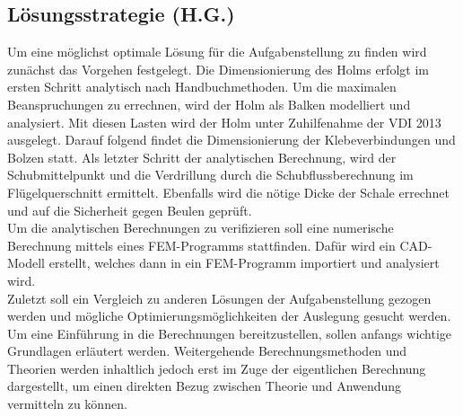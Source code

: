 \subsection{Lösungsstrategie (H.G.)}
Um eine möglichst optimale Lösung für die Aufgabenstellung zu finden wird zunächst das Vorgehen festgelegt. Die Dimensionierung des Holms erfolgt im ersten Schritt analytisch nach Handbuchmethoden. Um die maximalen Beanspruchungen zu errechnen, wird der Holm als Balken modelliert und analysiert. Mit diesen Lasten wird der Holm unter Zuhilfenahme der VDI 2013 ausgelegt. Darauf folgend findet die Dimensionierung der Klebeverbindungen und Bolzen statt. Als letzter Schritt der analytischen Berechnung, wird der Schubmittelpunkt und die Verdrillung durch die Schubflussberechnung im Flügelquerschnitt ermittelt. Ebenfalls wird die nötige Dicke der Schale errechnet und auf die Sicherheit gegen Beulen geprüft. \\
Um die analytischen Berechnungen zu verifizieren soll eine numerische Berechnung mittels eines FEM-Programms stattfinden. Dafür wird ein CAD-Modell erstellt, welches dann in ein FEM-Programm importiert und analysiert wird.\\
Zuletzt soll ein Vergleich zu anderen Lösungen der Aufgabenstellung gezogen werden und mögliche Optimierungsmöglichkeiten der Auslegung gesucht werden.\\

\noindent Um eine Einführung in die Berechnungen bereitzustellen, sollen anfangs wichtige Grundlagen erläutert werden. Weitergehende Berechnungsmethoden und Theorien werden inhaltlich jedoch erst im Zuge der eigentlichen Berechnung dargestellt, um einen direkten Bezug zwischen Theorie und Anwendung vermitteln zu können. 
